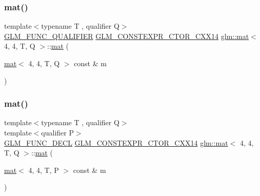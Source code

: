 \subsubsection{\texorpdfstring{mat()}{mat()}\hspace{0.1cm}{\footnotesize\ttfamily [2/21]}}
{\footnotesize\ttfamily template$<$typename T , qualifier Q$>$ \\
\mbox{\hyperlink{setup_8hpp_a33fdea6f91c5f834105f7415e2a64407}{G\+L\+M\+\_\+\+F\+U\+N\+C\+\_\+\+Q\+U\+A\+L\+I\+F\+I\+ER}} \mbox{\hyperlink{setup_8hpp_a0900f9145e68bf6061b6f5e7be3fa751}{G\+L\+M\+\_\+\+C\+O\+N\+S\+T\+E\+X\+P\+R\+\_\+\+C\+T\+O\+R\+\_\+\+C\+X\+X14}} \mbox{\hyperlink{structglm_1_1mat}{glm\+::mat}}$<$ 4, 4, T, Q $>$\+::\mbox{\hyperlink{structglm_1_1mat}{mat}} (\begin{DoxyParamCaption}\item[{\mbox{\hyperlink{structglm_1_1mat}{mat}}$<$ 4, 4, T, Q $>$ const \&}]{m }\end{DoxyParamCaption})}

\mbox{\label{structglm_1_1mat_3_014_00_014_00_01_t_00_01_q_01_4_a9bb105cf95abdde89031315e39bcbe9a}} 
\subsubsection{\texorpdfstring{mat()}{mat()}\hspace{0.1cm}{\footnotesize\ttfamily [3/21]}}
{\footnotesize\ttfamily template$<$typename T , qualifier Q$>$ \\
template$<$qualifier P$>$ \\
\mbox{\hyperlink{setup_8hpp_ab2d052de21a70539923e9bcbf6e83a51}{G\+L\+M\+\_\+\+F\+U\+N\+C\+\_\+\+D\+E\+CL}} \mbox{\hyperlink{setup_8hpp_a0900f9145e68bf6061b6f5e7be3fa751}{G\+L\+M\+\_\+\+C\+O\+N\+S\+T\+E\+X\+P\+R\+\_\+\+C\+T\+O\+R\+\_\+\+C\+X\+X14}} \mbox{\hyperlink{structglm_1_1mat}{glm\+::mat}}$<$ 4, 4, T, Q $>$\+::\mbox{\hyperlink{structglm_1_1mat}{mat}} (\begin{DoxyParamCaption}\item[{\mbox{\hyperlink{structglm_1_1mat}{mat}}$<$ 4, 4, T, P $>$ const \&}]{m }\end{DoxyParamCaption})}

\mbox{\label{structglm_1_1mat_3_014_00_014_00_01_t_00_01_q_01_4_a120c0dcb0ff63f8c2581bec91de7c0bb}} 

